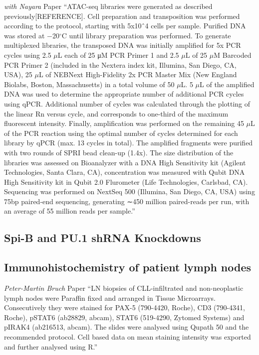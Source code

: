 \documentclass[11pt, a4paper, twosided]{book}
\begin{document}
\emph{with Nayara} Paper
``ATAC-seq libraries were generated as described previously{[}REFERENCE{]}. Cell preparation and transposition was performed according to the protocol, starting with 5x10ˆ4 cells per sample. Purified DNA was stored at −20\(^\circ\)C until library preparation was performed. To generate multiplexed libraries, the transposed DNA was initially amplified for 5x PCR cycles using 2.5 \(\mu\)L each of 25 μM PCR Primer 1 and 2.5 \(\mu\)L of 25 \(\mu\)M Barcoded PCR Primer 2 (included in the Nextera index kit, Illumina, San Diego, CA, USA), 25 \(\mu\)L of NEBNext High-Fidelity 2x PCR Master Mix (New England Biolabs, Boston, Massachusetts) in a total volume of 50 \(\mu\)L. 5 \(\mu\)L of the amplified DNA was used to determine the appropriate number of additional PCR cycles using qPCR. Additional number of cycles was calculated through the plotting of the linear Rn versus cycle, and corresponds to one-third of the maximum fluorescent intensity. Finally, amplification was performed on the remaining 45 \(\mu\)L of the PCR reaction using the optimal number of cycles determined for each library by qPCR (max. 13 cycles in total). The amplified fragments were purified with two rounds of SPRI bead clean-up (1.4x). The size distribution of the libraries was assessed on Bioanalyzer with a DNA High Sensitivity kit (Agilent Technologies, Santa Clara, CA), concentration was measured with Qubit DNA High Sensitivity kit in Qubit 2.0 Flurometer (Life Technologies, Carlsbad, CA). Sequencing was performed on NextSeq 500 (Illumina, San Diego, CA, USA) using 75bp paired-end sequencing, generating ∼450 million paired-reads per run, with an average of 55 million reads per sample.''

\hypertarget{spi-b-and-pu.1-shrna-knockdowns}{%
\subsection{Spi-B and PU.1 shRNA Knockdowns}\label{spi-b-and-pu.1-shrna-knockdowns}}

\hypertarget{immunohistochemistry-of-patient-lymph-nodes}{%
\subsection{Immunohistochemistry of patient lymph nodes}\label{immunohistochemistry-of-patient-lymph-nodes}}

\emph{Peter-Martin Bruch} Paper
``LN biopsies of CLL-infiltrated and non-neoplastic lymph nodes were Paraffin fixed and arranged in Tissue Microarrays. Consecutively they were stained for PAX-5 (790-4420, Roche), CD3 (790-4341, Roche), pSTAT6 (ab28829, abcam), STAT6 (519-4290, Zytomed Systems) and pIRAK4 (ab216513, abcam). The slides were analysed using Qupath 50 and the recommended protocol. Cell based data on mean staining intensity was exported and further analysed using R.''
\end{document}
